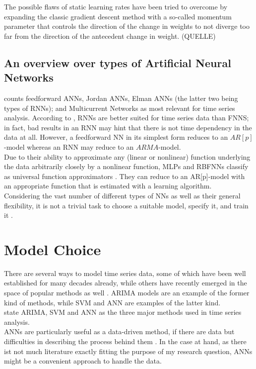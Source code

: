 \documentclass[a4paper, 11pt]{article}
\begin{document}
The possible flaws of static learning rates have been tried to overcome by expanding the classic gradient descent method with a so-called momentum parameter that controls the direction of the change in weights to not diverge too far from the direction of the antecedent change in weight. (QUELLE)

\subsection{An overview over types of Artificial Neural Networks} 

\cite{Dorffner96neuralnetworks} counts feedforward ANNs, Jordan ANNs, Elman ANNs (the latter two being types of RNNs); and Multicurrent Networks as most relevant for time series analysis.
According to \cite{Balkin.1997}, RNNs are better suited for time series data than FNNS; in fact, bad results in an RNN may hint that there is not time dependency in the data at all. However, a feedforward NN in its simplest form reduces to an $AR[p]$-model whereas an RNN may reduce to an $ARMA$-model.\\

Due to their ability to approximate any (linear or nonlinear) function underlying the data arbitrarily closely by a nonlinear function, MLPs and RBFNNs classify as universal function approximators \citep{Dorffner96neuralnetworks}. They can reduce to an AR[p]-model with an appropriate function that is estimated with a learning algorithm.\\
Considering the vast number of different types of NNs as well as their general flexibility, it is not a trivial task to choose a suitable model, specify it, and train it \citep{Kourentzes.2014}. 
\section{Model Choice}

There are several ways to model time series data, some of which have been well established for many decades already, while others have recently emerged in the space of popular methods as well . ARIMA models are an example of the former kind of methods, while SVM and ANN are examples of the latter kind. \citep{Adhikari.2015}\\
\cite{JoaoF.L.Oliveira.2014} state ARIMA, SVM and ANN as the three major methods used in time series analysis. \\

ANNs are particularly useful as a data-driven method, if there are data but difficulties in describing the process behind them \citep{Zhang.1998}. In the case at hand, as there ist not much literature exactly fitting the purpose of my research question, ANNs might be a convenient approach to handle the data.\\
\end{document}

